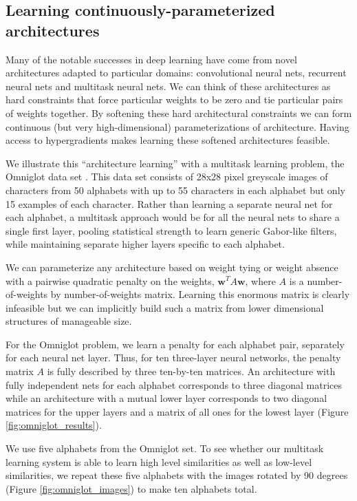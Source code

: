 \documentclass{article}
\newcommand{\vw}{\mathbf{w}}
\begin{document}
\subsection{Learning continuously-parameterized architectures}

Many of the notable successes in deep learning have come from novel
architectures adapted to particular domains: convolutional neural nets,
recurrent neural nets and multitask neural nets. We can think of these
architectures as hard constraints that force particular weights to be zero and
tie particular pairs of weights together. By softening these hard architectural
constraints we can form continuous (but very high-dimensional) parameterizations
of architecture. Having access to hypergradients makes learning these
softened architectures feasible.

We illustrate this ``architecture learning'' with a multitask learning
problem, the Omniglot data set \citep{Omniglot}. This data set consists of 28x28
pixel greyscale images of characters from 50 alphabets with up to 55 characters in
each alphabet but only 15 examples of each character. Rather than learning a
separate neural net for each alphabet, a multitask approach would be for all the
neural nets to share a single first layer, pooling statistical strength to learn
generic Gabor-like filters, while maintaining separate higher layers specific to
each alphabet.

We can parameterize any architecture based on weight tying or weight absence
with a pairwise quadratic penalty on the weights, $\vw^T A \vw$, where $A$ is a
number-of-weights by number-of-weights matrix. Learning this enormous matrix is
clearly infeasible but we can implicitly build such a matrix from lower
dimensional structures of manageable size.

For the Omniglot problem, we learn a penalty for each alphabet pair, separately
for each neural net layer. Thus, for ten three-layer neural networks,
the penalty matrix $A$ is fully described by three ten-by-ten matrices. An
architecture with fully independent nets for each alphabet corresponds to three
diagonal matrices while an architecture with a mutual lower layer corresponds to
two diagonal matrices for the upper layers and a matrix of all ones
for the lowest layer (Figure \ref{fig:omniglot_results}).

We use five alphabets from the Omniglot set. To see whether our multitask
learning system is able to learn high level similarities as well as
low-level similarities, we repeat these five alphabets with the images rotated
by 90 degrees (Figure \ref{fig:omniglot_images}) to make ten alphabets total.
\end{document}
